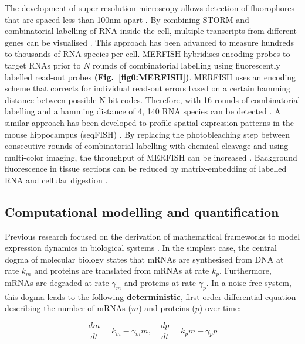 The development of super-resolution microscopy allows detection of fluorophores that are spaced less than 100nm apart \citep{Sydor2015}. By combining \gls{STORM} and combinatorial labelling of RNA inside the cell, multiple transcripts from different genes can be visualised \citep{Lubeck2012}. This approach has been advanced to measure hundreds to thousands of RNA species per cell. \Gls{MERFISH} hybridises encoding probes to target RNAs prior to $N$ rounds of combinatorial labelling using fluorescently labelled read-out probes \textbf{(Fig.~\ref{fig0:MERFISH})}. MERFISH uses an encoding scheme that corrects for individual read-out errors based on a certain hamming distance between possible N-bit codes. Therefore, with 16 rounds of combinatorial labelling and a hamming distance of 4, 140 RNA species can be detected \citep{Chen2015}. A similar approach has been developed to profile spatial expression patterns in the mouse hippocampus (seqFISH) \citep{Shah2016}. By replacing the photobleaching step between consecutive rounds of combinatorial labelling with chemical cleavage and using multi-color imaging, the throughput of MERFISH can be increased \citep{Moffitt2016a}. Background fluorescence in tissue sections can be reduced by matrix-embedding of labelled RNA and cellular digestion \citep{Moffitt2016}.

\subsection{Computational modelling and quantification}

Previous research focused on the derivation of mathematical frameworks to model expression dynamics in biological systems \citep{Tsimring2014}. In the simplest case, the central dogma of molecular biology states that mRNAs are synthesised from DNA at rate $k_m$ and proteins are translated from mRNAs at rate $k_p$. Furthermore, mRNAs are degraded at rate $\gamma_m$ and proteins at rate $\gamma_p$. In a noise-free system, this dogma leads to the following \textbf{deterministic}, first-order differential equation describing the number of mRNAs ($m$) and proteins ($p$) over time:

\begin{equation}
\frac{dm}{dt}=k_m-\gamma{}_mm,\quad \frac{dp}{dt}=k_pm-\gamma{}_pp
\end{equation}

